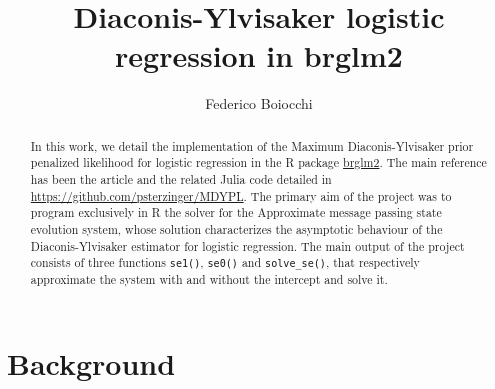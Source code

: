 \documentclass{article}
\title{Diaconis-Ylvisaker logistic regression in brglm2}
\author[*]{Federico Boiocchi}
\affil[*]{Visiting student, Department of Statistics, University of Warwick}
\begin{document}
\maketitle

\begin{abstract}
\noindent In this work, we detail the implementation of the Maximum Diaconis-Ylvisaker prior penalized likelihood for logistic regression in the R package \href{https://cran.r-project.org/web/packages/brglm2/index.html}{brglm2}. The main reference has been the article \citep{DYkosmidis} and the related Julia code detailed in  \url{https://github.com/psterzinger/MDYPL}. The primary aim of the project was to program exclusively in R the solver for the Approximate message passing state evolution system, whose solution characterizes the asymptotic behaviour of the Diaconis-Ylvisaker estimator for logistic regression. The main output of the project consists of three functions \texttt{se1()}, \texttt{se0()} and \texttt{solve\_se()}, that respectively approximate the  system with and without the intercept and solve it. 
\end{abstract}

\section{Background}
\end{document}
